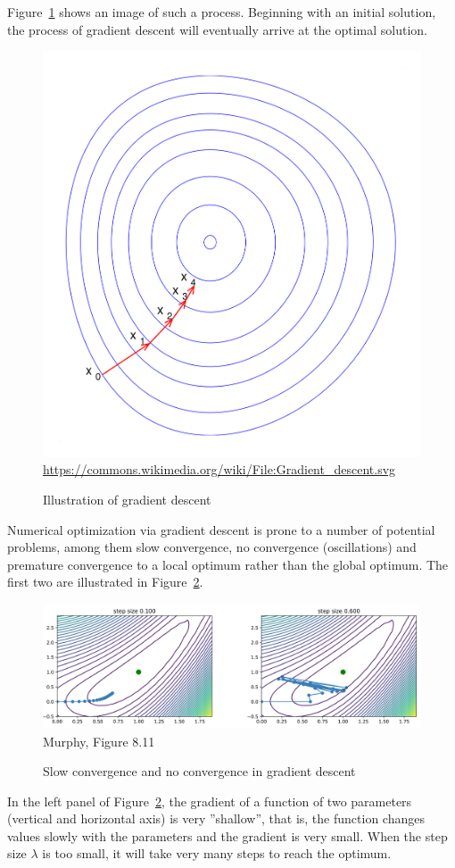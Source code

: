 Figure~\ref{fig:gradientdescent} shows an image of such a process. Beginning with an initial solution, the process of gradient descent will eventually arrive at the optimal solution.

\begin{figure}
\centering
\includegraphics[width=.5\textwidth]{gradient_descent.png} \\

\scriptsize \url{https://commons.wikimedia.org/wiki/File:Gradient_descent.svg}
\caption{Illustration of gradient descent}
\label{fig:gradientdescent}
\end{figure}

Numerical optimization via gradient descent is prone to a number of potential problems, among them slow convergence, no convergence (oscillations) and premature convergence to a local optimum rather than the global optimum. The first two are illustrated in Figure~\ref{fig:screen4_chap15}.

\begin{figure}
\centering
\includegraphics[width=\linewidth]{screen4} \\

\scriptsize Murphy, Figure 8.11
\caption{Slow convergence and no convergence in gradient descent}
\label{fig:screen4_chap15}
\end{figure}

In the left panel of Figure~\ref{fig:screen4_chap15}, the gradient of a function of two parameters (vertical and horizontal axis) is very ''shallow'', that is, the function changes values slowly with the parameters and the gradient is very small. When the step size $\lambda$ is too small, it will take very many steps to reach the optimum. 


